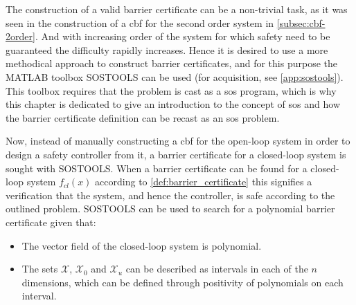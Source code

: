 The construction of a valid barrier certificate can be a non-trivial task, as it was seen in the construction of a \gls{cbf} for the second order system in \autoref{subsec:cbf-2order}. And with increasing order of the system for which safety need to be guaranteed the difficulty rapidly increases. Hence it is desired to use a more methodical approach to construct barrier certificates, and for this purpose the MATLAB toolbox SOSTOOLS can be used \citep{bib:prajna_framework} (for acquisition, see \autoref{app:sostools}). This toolbox requires that the problem is cast as a \gls{sos} program, which is why this chapter is dedicated to give an introduction to the concept of \gls{sos} and how the barrier certificate definition can be recast as an \gls{sos} problem.

Now, instead of manually constructing a \gls{cbf} for the open-loop system in order to design a safety controller from it, a barrier certificate for a closed-loop system is sought with SOSTOOLS.
When a barrier certificate can be found for a closed-loop system $f_{cl}(x)$ according to \autoref{def:barrier_certificate} this signifies a verification that the system, and hence the controller, is safe according to the outlined problem. 
SOSTOOLS can be used to search for a polynomial barrier certificate given that: \citep{bib:prajna_framework}
\vspace{-2mm}
\begin{itemize}
	\itemsep-0.5mm
\item The vector field of the closed-loop system is polynomial.
\item The sets $\mathcal{X}$, $\mathcal{X}_0$ and $\mathcal{X}_u$ can be described as intervals in each of the $n$ dimensions, which can be defined through positivity of polynomials on each interval.
\end{itemize}

